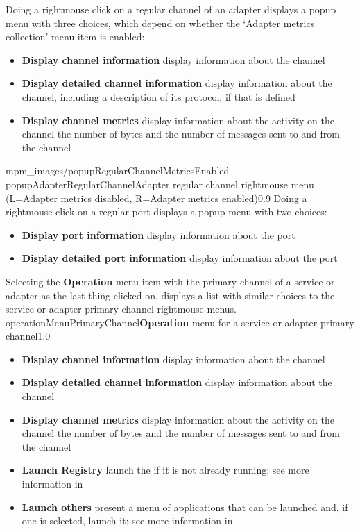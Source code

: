 Doing a right\longDash{}mouse click on a regular channel of an adapter displays a popup
menu with three choices, which depend on whether the `Adapter metrics collection' menu
item is enabled:
\begin{itemize}
\item\textbf{Display channel information} display information about the channel
\item\exSp\textbf{Display detailed channel information} display information about the
channel, including a description of its protocol, if that is defined
\item\exSp\textbf{Display channel metrics} display information about the activity on the
channel \longDash{} the number of bytes and the number of messages sent to and from the
channel
\end{itemize}
%
{mpm_images/popupRegularChannelMetricsEnabled}%
{popupAdapterRegularChannel}{Adapter regular channel right\longDash{}mouse menu (L=Adapter
metrics disabled, R=Adapter metrics enabled)}{0.9}
\condPage{}
Doing a right\longDash{}mouse click on a regular port displays a popup menu with two
choices:
\begin{itemize}
\item\textbf{Display port information} display information about the port
\item\exSp\textbf{Display detailed port information} display information about the port
\end{itemize}
\condPage{}
Selecting the \textbf{Operation} menu item with the primary channel of a service or
adapter as the last thing clicked on, displays a list with similar choices to the service
or adapter primary channel right\longDash{}mouse menus.\\
%
{operationMenuPrimaryChannel}{\textbf{Operation} menu for a service or adapter primary
channel}{1.0}
\begin{itemize}
\item\textbf{Display channel information} display information about the channel
\item\exSp\textbf{Display detailed channel information} display information about the
channel
\item\exSp\textbf{Display channel metrics} display information about the activity on the
channel \longDash{} the number of bytes and the number of messages sent to and from the
channel
\item\exSp\textbf{Launch Registry} launch the \emph{\RS} if it is not already running; see
more information in\\
\item\exSp\textbf{Launch others \textellipsis} present a menu of applications that can be
launched and, if one is selected, launch it; see more information in
\end{itemize}
